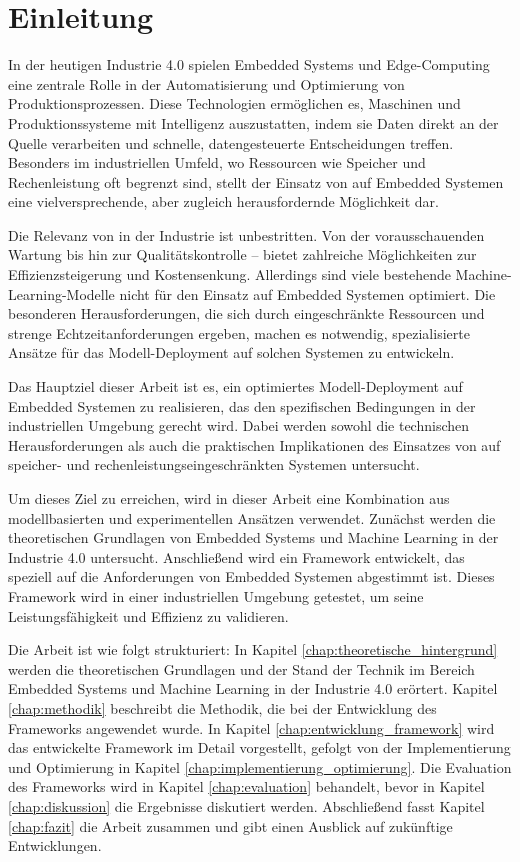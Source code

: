 \chapter{Einleitung}
\label{chap:einleitung}


In der heutigen Industrie 4.0 spielen Embedded Systems und Edge-Computing eine zentrale Rolle in der Automatisierung und Optimierung von Produktionsprozessen.
Diese Technologien ermöglichen es, Maschinen und Produktionssysteme mit Intelligenz auszustatten, indem sie Daten direkt an der Quelle verarbeiten und schnelle,
datengesteuerte Entscheidungen treffen. Besonders im industriellen Umfeld, wo Ressourcen wie Speicher und Rechenleistung oft begrenzt sind, stellt der Einsatz von \ML 
auf Embedded Systemen eine vielversprechende, aber zugleich herausfordernde Möglichkeit dar.

Die Relevanz von \ML in der Industrie ist unbestritten. 
Von der vorausschauenden Wartung bis hin zur Qualitätskontrolle – \ML bietet zahlreiche Möglichkeiten zur Effizienzsteigerung und Kostensenkung. 
Allerdings sind viele bestehende Machine-Learning-Modelle nicht für den Einsatz auf Embedded Systemen optimiert. 
Die besonderen Herausforderungen, die sich durch eingeschränkte Ressourcen und strenge Echtzeitanforderungen ergeben, machen es notwendig, 
spezialisierte Ansätze für das Modell-Deployment auf solchen Systemen zu entwickeln.

Das Hauptziel dieser Arbeit ist es, ein optimiertes Modell-Deployment auf Embedded Systemen zu realisieren, das den spezifischen Bedingungen in der industriellen Umgebung gerecht wird. 
Dabei werden sowohl die technischen Herausforderungen als auch die praktischen Implikationen des Einsatzes von \ML auf speicher- und rechenleistungseingeschränkten Systemen untersucht.

Um dieses Ziel zu erreichen, wird in dieser Arbeit eine Kombination aus modellbasierten und experimentellen Ansätzen verwendet. 
Zunächst werden die theoretischen Grundlagen von Embedded Systems und Machine Learning in der Industrie 4.0 untersucht. 
Anschließend wird ein Framework entwickelt, das speziell auf die Anforderungen von Embedded Systemen abgestimmt ist. 
Dieses Framework wird in einer industriellen Umgebung getestet, um seine Leistungsfähigkeit und Effizienz zu validieren.

Die Arbeit ist wie folgt strukturiert: In Kapitel \ref{chap:theoretische_hintergrund} werden die theoretischen Grundlagen und der Stand der Technik im Bereich Embedded Systems und Machine Learning in der Industrie 4.0 erörtert. 
Kapitel \ref{chap:methodik} beschreibt die Methodik, die bei der Entwicklung des Frameworks angewendet wurde. 
In Kapitel \ref{chap:entwicklung_framework} wird das entwickelte Framework im Detail vorgestellt, gefolgt von der Implementierung und Optimierung in Kapitel \ref{chap:implementierung_optimierung}. 
Die Evaluation des Frameworks wird in Kapitel \ref{chap:evaluation} behandelt, bevor in Kapitel \ref{chap:diskussion} die Ergebnisse diskutiert werden. 
Abschließend fasst Kapitel \ref{chap:fazit} die Arbeit zusammen und gibt einen Ausblick auf zukünftige Entwicklungen.

